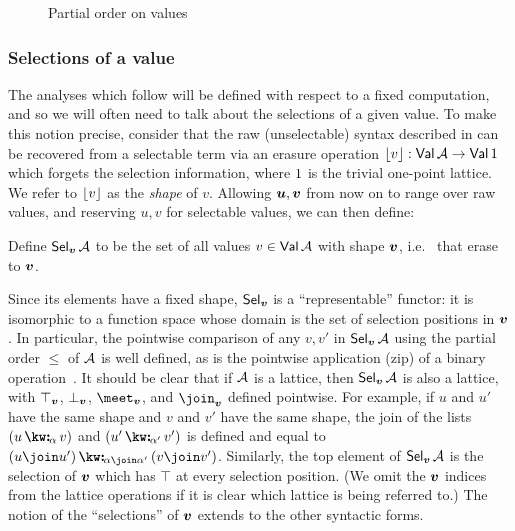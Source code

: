 \begin{figure}
   
   \caption{Partial order on values}
   \label{fig:data-dependencies:leq}
\end{figure}

\subsubsection{Selections of a value}
\label{sec:data-dependencies:selections}

The analyses which follow will be defined with respect to a fixed computation, and so we will often need to talk about the selections of a given value. To make this notion precise, consider that the raw (unselectable) syntax described in  can be recovered from a selectable term via an erasure operation $\lfloor v\rfloor: \textup{\textsf{Val}}\,{\mathcal{A}} \to \textup{\textsf{Val}}\,{1}$ which forgets the selection information, where $1$ is the trivial one-point lattice. We refer to $\lfloor v\rfloor$ as the \emph{shape} of $v$. Allowing $\bm{u}, \bm{v}$ from now on to range over raw values, and reserving $u, v$ for selectable values, we can then define:

\begin{definition}
   Define $\textup{\textsf{Sel}}_{\bm{v}}\,{\mathcal{A}}$ to be the set of all values $v \in \textup{\textsf{Val}}\,{\mathcal{A}}$ with shape $\bm{v}$, i.e.
   ~that erase to $\bm{v}$.
\end{definition}

Since its elements have a fixed shape, $\textup{\textsf{Sel}}_{\bm{v}}$ is a ``representable'' functor: it is isomorphic to a function space whose domain is the set of selection positions in $\bm{v}$. In particular, the pointwise comparison of any $v, v'$ in $\textup{\textsf{Sel}}_{\bm{v}}\,{\mathcal{A}}$ using the partial order $\leq$ of $\mathcal{A}$ is well defined, as is the pointwise application (zip) of a binary operation~\cite{gibbons17}. It should be clear that if $\mathcal{A}$ is a lattice, then $\textup{\textsf{Sel}}_{\bm{v}}\,{\mathcal{A}}$ is also a lattice, with $\top_{\bm{v}}$, $\bot_{\bm{v}}$, $\meet_{\raw{v}}$, and $\join_{\raw{v}}$ defined pointwise. For example, if $u$ and $u'$ have the same shape and $v$ and $v'$ have the same shape, the join of the lists $(\annCons{u}{v}{\alpha})$ and $(\annCons{u'}{v'}{\alpha'})$ is defined and equal to $\annCons{(u \join u')}{(v \join v')}{\alpha \join \alpha'}$. Similarly, the top element of $\textup{\textsf{Sel}}_{\bm{v}}\,{\mathcal{A}}$ is the selection of $\bm{v}$ which has $\top$ at every selection position. (We omit the $\bm{v}$ indices from the lattice operations if it is clear which lattice is being referred to.) The notion of the ``selections'' of $\bm{v}$ extends to the other syntactic forms.

